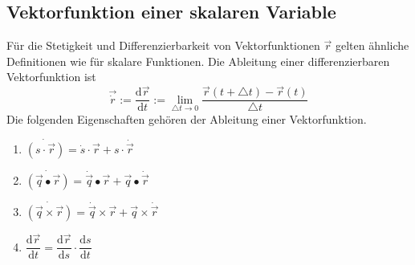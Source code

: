 \subsection{Vektorfunktion einer skalaren Variable}
Für die Stetigkeit und Differenzierbarkeit von Vektorfunktionen $\overrightarrow{r}$ gelten ähnliche Definitionen wie für skalare Funktionen. Die Ableitung einer differenzierbaren Vektorfunktion ist
\begin{equation}
\boxed{\overrightarrow{\dot{r}}:=\dfrac{\text{d}\overrightarrow{r}}{\text{d}t}:=\displaystyle \lim_{\triangle t\rightarrow 0}\dfrac{\overrightarrow{r}\left(t+\triangle t\right)-\overrightarrow{r}\left(t\right)}{\triangle t}}
\end{equation}
Die folgenden Eigenschaften gehören der Ableitung einer Vektorfunktion.
\begin{enumerate}[$(i)$]
\item $\dot{\left(s\cdot \overrightarrow{r}\right)}=\dot{s}\cdot \overrightarrow{r}+s\cdot \dot{\overrightarrow{r}}$
\item $\dot{\left(\overrightarrow{q}\bullet \overrightarrow{r}\right)}=\dot{\overrightarrow{q}}\bullet \overrightarrow{r}+\overrightarrow{q}\bullet \dot{\overrightarrow{r}}$
\item $\dot{\left(\overrightarrow{q}\times \overrightarrow{r}\right)}=\dot{\overrightarrow{q}}\times \overrightarrow{r}+\overrightarrow{q}\times \dot{\overrightarrow{r}}$
\item $\dfrac{\text{d}\overrightarrow{r}}{\text{d}t}=\dfrac{\text{d}\overrightarrow{r}}{\text{d}s}\cdot \dfrac{\text{d}s}{\text{d}t}$
\end{enumerate}

